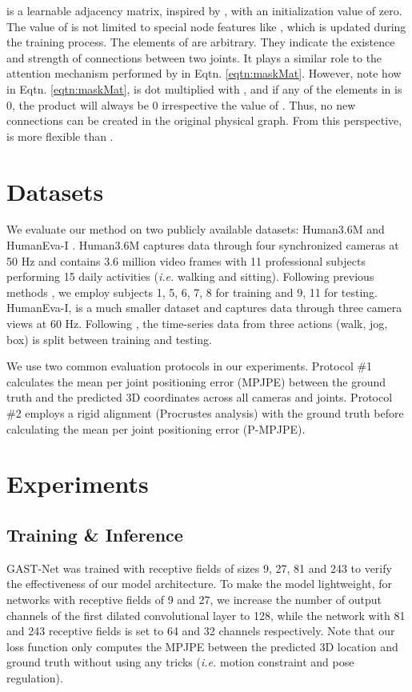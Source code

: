 \documentclass[letterpaper, 10 pt, conference, twoside]{ieeeconf}
\begin{document}
\textbf{} is a learnable adjacency matrix, inspired by \cite{shi2019two}, with an initialization value of zero. The value of  is not limited to special node features like , which is updated during the training process. The elements of \textbf{} are arbitrary. They indicate the existence and strength of connections between two joints. It plays a similar role to the attention mechanism performed by  in Eqtn. \ref{eqtn:maskMat}. However, note how in Eqtn. \ref{eqtn:maskMat},   is dot multiplied with , and if any of the elements in  is 0, the product will always be 0 irrespective the value of . Thus, no new connections can be created in the original physical graph. From this perspective, \textbf{} is more flexible than .
\section{Datasets}
We evaluate our method on two publicly available datasets: Human3.6M \cite{ionescu2013human3} and HumanEva-I \cite{sigal2010humaneva}. Human3.6M captures data through four synchronized cameras at 50 Hz and contains 3.6 million video frames with 11 professional subjects performing 15 daily activities (\emph{i.e.} walking and sitting). Following previous methods \cite{martinez2017simple,rayat2018exploiting,pavllo20193d}, we employ subjects 1, 5, 6, 7, 8 for training and 9, 11 for testing. HumanEva-I, is a much smaller dataset and captures data through three camera views at 60 Hz. Following \cite{rayat2018exploiting,pavllo20193d}, the time-series data from three actions (walk, jog, box) is split between training and testing. 

We use two common evaluation protocols in our experiments. Protocol \#1 calculates the mean per joint positioning error (MPJPE) between the ground truth and the predicted 3D coordinates across all cameras and joints. Protocol \#2 employs a rigid alignment (Procrustes analysis) with the ground truth before calculating the mean per joint positioning error (P-MPJPE).


\section{Experiments}
\subsection{Training \& Inference}


GAST-Net was trained with receptive fields of sizes 9, 27, 81 and 243 to verify the effectiveness of our model architecture. To make the model lightweight, for networks with receptive fields of 9 and 27, we increase the number of output channels of the first dilated convolutional layer to 128, while the network with 81 and 243 receptive fields is set to 64 and 32 channels respectively. Note that our loss function only computes the MPJPE between the predicted 3D location and ground truth without using any tricks (\emph{i.e.} motion constraint and pose regulation).
\end{document}
